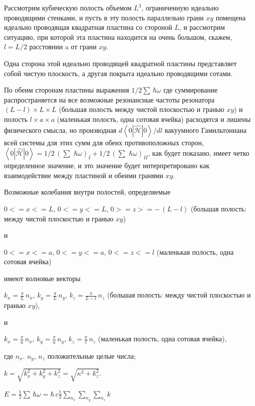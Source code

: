 \documentclass[11pt]{article}
\begin{document}
    Рассмотрим кубическую полость объемом \(L^3\), ограниченную идеально
проводящими стенками, и пусть в эту полость параллельно грани \(xy\)
помещена идеально проводящая квадратная пластина со стороной \(L\), и
рассмотрим ситуацию, при которой эта пластина находится на очень
большом, скажем, \(l = L/2\) расстоянии a от грани \(xy\).

Одна сторона этой идеально проводящей квадратной пластины представляет
собой чистую плоскость, а другая покрыта идеально проводящими сотами.

По обеим сторонам пластины выражения \(1\big/2\sum\,\hbar\omega\) где
суммирование распространяется на все возможные резонансные частоты
резонатора \(\left(L-l\right)\times L\times L\) (большая полость между
чистой плоскостью и гранью \(xy\)) и полость \(l\times a\times a\)
(маленькая полость, одна сотовая ячейка) расходятся и лишены физического
смысла, но производная
\({d\left<0|\hat {\mathcal{H}}|0\right>}\big/{dl}\) вакуумного
Гамильтониана всей системы для этих сумм для обеих противоположных
сторон,
\(\left<0|\hat{\mathcal{H}}|0\right> = 1\big/2\,\left(\sum\,\,\hbar\omega\right)_{I} + 1\big/2\,\left(\sum\,\,\hbar\omega\right)_{II}\),
как будет показано, имеет четко определенное значение, и это значение
будет интерпретировано как взаимодействие между пластиной и обеими
гранями \(xy\).

    Возможные колебания внутри полостей, определяемые

\(0<=x<=L\), \(0<=y<=L\), \(0>=z>=-\,(L-l)\) (большая полость: между
чистой плоскостью и гранью \(xy\))

и

\(0<=x<=a\), \(0<=y<=a\), \(0<=z<=l\) (маленькая полость, одна сотовая
ячейка)

    имеют волновые векторы

\(k_x = \frac{\pi}{L}\,n_x\), \(k_y = \frac{\pi}{L}\,n_y\),
\(k_z = \frac{\pi}{L-l}\,n_z\) (большая полость: между чистой плоскостью
и гранью \(xy\)),

и

\(k_x = \frac{\pi}{a}\,n_x\), \(k_y = \frac{\pi}{a}\,n_y\),
\(k_z = \frac{\pi}{l}\,n_z\) (маленькая полость, одна сотовая ячейка),

где \(n_x\). \(n_y\), \(n_z\) положительные целые числа;

\(k = \sqrt{k_x^2+k_y^2+k_z^2} = \sqrt{\kappa^2+k_z^2}\).

\(E = \frac{1}{2}\sum\,\hbar\omega = \hbar\,c\frac{1}{2}\sum\limits_{n_x}^{}\sum\limits_{n_y}^{}\sum\limits_{n_z}^{}k\)
\end{document}
